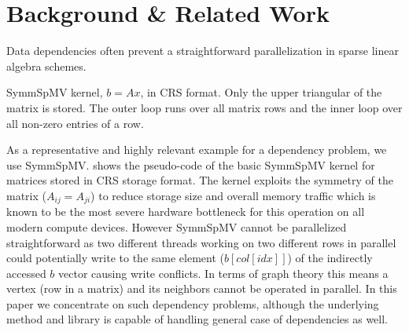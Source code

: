 \section{Background \& Related Work} \label{sec:background}
Data dependencies often prevent a straightforward parallelization in sparse linear algebra schemes.
\begin{algorithm}[tb]
	\caption{\label{alg:symmSpMV} \acrshort{SymmSpMV} kernel,  $b=Ax$, in \acrshort{CRS} format. Only the upper triangular of the matrix is stored. The outer loop runs over all matrix rows and the inner loop over all non-zero entries of a row.}
	\begin{algorithmic}[1]
			\EndFor
		\EndFor
	\end{algorithmic}
\end{algorithm}
As a representative and highly relevant example for a \DTWO dependency problem, we use \acrfull{SymmSpMV}. 
 shows the pseudo-code of the basic \acrshort{SymmSpMV} kernel 
for matrices stored in \acrfull{CRS} \cite{CRS} storage format. The kernel exploits the symmetry
of the matrix ($A_{ij} = A_{ji}$) to reduce storage size and overall 
memory traffic which is known to be the most severe hardware bottleneck for this operation on all modern compute devices.  
However \acrshort{SymmSpMV} cannot be parallelized straightforward as two 
different threads working on two different rows in parallel could potentially 
write to the same element ($b[col[idx]]$) of the indirectly accessed $b$ vector
causing write conflicts.
In terms of graph theory this means a vertex (row in a matrix) and 
its \DTWO neighbors \cite{dist_k_def} cannot be operated in parallel.
In this paper we concentrate on such \DTWO dependency problems, although 
the underlying method and library is capable of handling 
general case of \DK dependencies as well.


